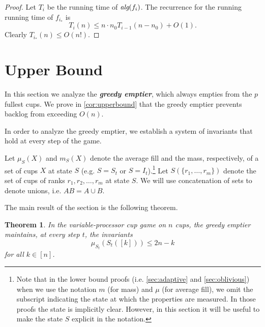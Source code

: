 \documentclass[twocolumn]{article}[10pt]
\newcommand{\defn}[1]{{\textit{\textbf{\boldmath #1}}}\xspace}
\newcommand{\alg}[1]{\textit{\text{alg}}({#1})}
\newtheorem{theorem}{Theorem}
\begin{document}
\begin{proof}
    Let $T_i$ be the running time of $\alg{f_i}$.
  The recurrence for the running running time of $f_{i_*}$ is 
  $$T_i(n) \le n \cdot n_0T_{i-1}(n-n_0)+O(1).$$
  Clearly $T_{i_*}(n) \le O(n!)$.

\end{proof}


\section{Upper Bound}\label{sec:upperBound}

In this section we analyze the \defn{greedy emptier}, which always empties
from the $p$ fullest cups. We prove in \cref{cor:upperbound} that the
greedy emptier prevents backlog from exceeding $O(n)$. 

In order to analyze the greedy emptier, we establish a system of invariants
that hold at every step of the game. 

Let $\mu_S(X)$ and $m_S(X)$ denote the average fill and the mass, respectively,
of a set of cups $X$ at state $S$ (e.g. $S=S_t$ or $S=I_t$).\footnote{Note that
  in the lower bound proofs (i.e. \cref{sec:adaptive} and 
  \cref{sec:oblivious}) when we use the notation $m$ (for mass) and $\mu$ (for
average fill), we omit the subscript indicating the state at which the
properties are measured. In those proofs the state is implicitly clear.
However, in this section it will be useful to make the state $S$ explicit in
the notation.} Let $S(\{r_1, \ldots, r_m\})$ denote the set of cups of ranks
$r_1, r_2, \ldots, r_m$ at state $S$. We will use concatenation of sets to
denote unions, i.e. $AB = A\cup B$. 

The main result of the section is the following theorem.  
\begin{theorem}
  \label{thm:invariant}
  In the variable-processor cup game on $n$ cups, the greedy emptier maintains, at every step $t$,
  the invariants
  \begin{equation}
    \label{eq:invariants}
      \mu_{S_t}(S_t([k])) \le 2n-k
  \end{equation}
  for all  $k \in [n]$.
\end{theorem}
\end{document}
